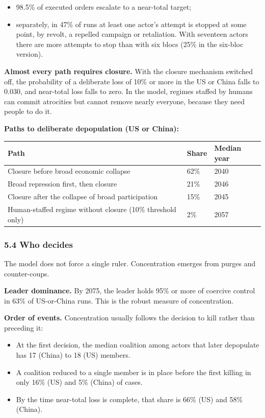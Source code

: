 \documentclass[
  10pt,
]{article}
\newcounter{none} %
\providecommand{\tightlist}{%
  \setlength{\itemsep}{0pt}\setlength{\parskip}{0pt}}
\begin{document}
\begin{itemize}
\tightlist
\item
  98.5\% of executed orders escalate to a near-total target;
\item
  separately, in 47\% of runs at least one actor's attempt is stopped at some point, by revolt, a
  repelled campaign or retaliation. With seventeen actors there are more attempts to stop than with
  six blocs (25\% in the six-bloc version).
\end{itemize}

\textbf{Almost every path requires closure.} With the closure mechanism switched off, the
probability of a deliberate loss of 10\% or more in the US or China falls to 0.030, and near-total
loss falls to zero. In the model, regimes staffed by humans can commit atrocities but cannot remove
nearly everyone, because they need people to do it.

\textbf{Paths to deliberate depopulation (US or China):}

{\def\LTcaptype{none} %
\begin{longtable}[]{@{}lll@{}}
\toprule\noalign{}
Path & Share & Median year \\
\midrule\noalign{}
\endhead
\bottomrule\noalign{}
\endlastfoot
Closure before broad economic collapse & 62\% & 2040 \\
Broad repression first, then closure & 21\% & 2046 \\
Closure after the collapse of broad participation & 15\% & 2045 \\
Human-staffed regime without closure (10\% threshold only) & 2\% & 2057 \\
\end{longtable}
}

\subsubsection{5.4 Who decides}\label{who-decides}

The model does not force a single ruler. Concentration emerges from purges and counter-coups.

\textbf{Leader dominance.} By 2075, the leader holds 95\% or more of coercive control in 63\% of
US-or-China runs. This is the robust measure of concentration.

\textbf{Order of events.} Concentration usually follows the decision to kill rather than preceding
it:

\begin{itemize}
\tightlist
\item
  At the first decision, the median coalition among actors that later depopulate has 17 (China) to
  18 (US) members.
\item
  A coalition reduced to a single member is in place before the first killing in only 16\% (US) and
  5\% (China) of cases.
\item
  By the time near-total loss is complete, that share is 66\% (US) and 58\% (China).
\end{itemize}
\end{document}
